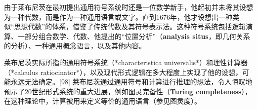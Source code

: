 由于莱布尼茨在最初提出通用符号系统时还是一位数学新手，他起初并未将其设想为一种代数，而是作为一种通用语言或文字。直到1676年，他才设想出一种类似“思想代数”的体系，借鉴了传统代数及其符号表示法。这种符号系统包括逻辑演算、一部分组合数学、代数、他提出的“位置分析”（\textbf{analysis situs}，即几何关系的分析）、一种通用概念语言，以及其他内容。

莱布尼茨实际所指的通用符号系统（*characteristica universalis*）和理性计算器（*calculus ratiocinator*），以及现代形式逻辑在多大程度上实现了他的设想，可能永远无法确定。[98] 莱布尼茨通过通用符号和计算进行推理的想法，令人惊叹地预示了20世纪形式系统的重大进展，例如图灵完备性（\textbf{Turing completeness}），在这种理论中，计算被用来定义等价的通用语言（参见图灵度）。